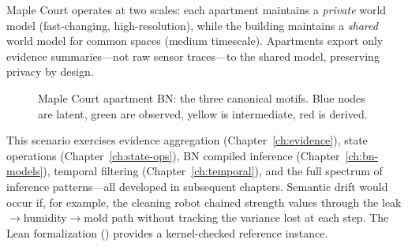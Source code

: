 \documentclass[11pt,openany]{report}
\begin{document}
\noindent
Maple Court operates at two scales: each apartment maintains a
\emph{private} world model (fast-changing, high-resolution), while the
building maintains a \emph{shared} world model for common spaces
(medium timescale).  Apartments export only evidence summaries---not
raw sensor traces---to the shared model, preserving privacy by design.

\begin{figure}[htbp]
\centering
{}
\caption{Maple Court apartment BN: the three canonical motifs.
  Blue nodes are latent, green are observed, yellow is intermediate,
  red is derived.}
\label{fig:maple-court-bn}
\end{figure}

This scenario exercises evidence aggregation
(Chapter~\ref{ch:evidence}), state operations
(Chapter~\ref{ch:state-ops}), BN compiled inference
(Chapter~\ref{ch:bn-models}), temporal filtering
(Chapter~\ref{ch:temporal}), and the full spectrum of inference
patterns---all developed in subsequent chapters.  Semantic drift would
occur if, for example, the cleaning robot chained strength values
through the leak$\to$humidity$\to$mold path without tracking the
variance lost at each step.  The Lean formalization
()
provides a kernel-checked reference instance.
\end{document}
